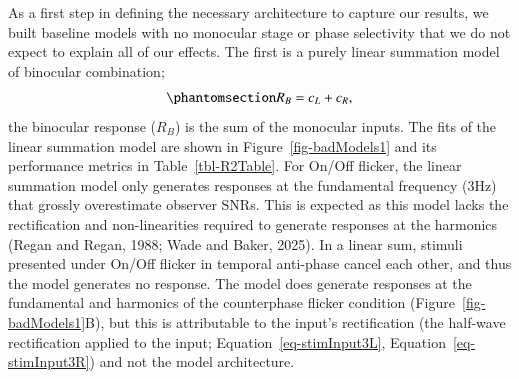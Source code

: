 \documentclass[review,
  12pt,
]{elsarticle}
\begin{document}
As a first step in defining the necessary architecture to capture our
results, we built baseline models with no monocular stage or phase
selectivity that we do not expect to explain all of our effects. The
first is a purely linear summation model of binocular combination;
\begin{equation}\phantomsection\label{eq-linearSumModel}{
R_B = c_L+c_R,
}\end{equation} the binocular response (\(R_B\)) is the sum of the
monocular inputs. The fits of the linear summation model are shown in
Figure~\ref{fig-badModels1} and its performance metrics in
Table~\ref{tbl-R2Table}. For On/Off flicker, the linear summation model
only generates responses at the fundamental frequency (3Hz) that grossly
overestimate observer SNRs. This is expected as this model lacks the
rectification and non-linearities required to generate responses at the
harmonics (Regan and Regan, 1988; Wade and Baker, 2025). In a linear
sum, stimuli presented under On/Off flicker in temporal anti-phase
cancel each other, and thus the model generates no response. The model
does generate responses at the fundamental and harmonics of the
counterphase flicker condition (Figure~\ref{fig-badModels1}B), but this
is attributable to the input's rectification (the half-wave
rectification applied to the input;
Equation~\ref{eq-stimInput3L}, Equation~\ref{eq-stimInput3R}) and not
the model architecture.
\end{document}
